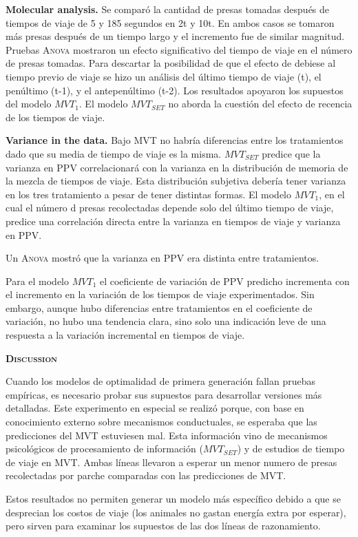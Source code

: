 \documentclass[a4paper,12pt]{article}
\begin{document}
{\bfseries Molecular analysis.} Se comparó la cantidad de presas tomadas después de tiempos de viaje de 5 y 185 segundos en 2t y 10t. En ambos casos se tomaron más presas después de un tiempo largo y el incremento fue de similar magnitud. Pruebas {\scshape Anova} mostraron un efecto significativo del tiempo de viaje en el número de presas tomadas. Para descartar la posibilidad de que el efecto de debiese al tiempo previo de viaje se hizo un análisis del último tiempo de viaje (t), el penúltimo (t-1), y el antepenúltimo (t-2). Los resultados apoyaron los supuestos del modelo $MVT_{1}$. El modelo $MVT_{SET}$ no aborda la cuestión del efecto de recencia de los tiempos de viaje.

{\bfseries Variance in the data.} Bajo MVT no habría diferencias entre los tratamientos dado que su media de tiempo de viaje es la misma. $MVT_{SET}$ predice que la varianza en PPV correlacionará con la varianza en la distribución de memoria de la mezcla de tiempos de viaje. Esta distribución subjetiva debería tener varianza en los tres tratamiento a pesar de tener distintas formas. El modelo $MVT_{1}$, en el cual el número d presas recolectadas depende solo del último tiempo de viaje, predice una correlación directa entre la varianza en tiempos de viaje y varianza en PPV.

Un {\scshape Anova} mostró que la varianza en PPV era distinta entre tratamientos.

Para el modelo $MVT_{1}$ el coeficiente de variación de PPV predicho incrementa con el incremento en la variación de los tiempos de viaje experimentados. Sin embargo, aunque hubo diferencias entre tratamientos en el coeficiente de variación, no hubo una tendencia clara, sino solo una indicación leve de una respuesta a la variación incremental en tiempos de viaje.

{\scshape\bfseries Discussion}

Cuando los modelos de optimalidad de primera generación fallan pruebas empíricas, es necesario probar sus supuestos para desarrollar versiones más detalladas. Este experimento en especial se realizó porque, con base en conocimiento externo sobre mecanismos conductuales, se esperaba que las predicciones del MVT estuviesen mal. Esta información vino de mecanismos psicológicos de procesamiento de información ($MVT_{SET}$) y de estudios de tiempo de viaje en MVT. Ambas líneas llevaron a esperar un menor numero de presas recolectadas por parche comparadas con las predicciones de MVT.

Estos resultados no permiten generar un modelo más específico debido a que se desprecian los costos de viaje (los animales no gastan energía extra por esperar), pero sirven para examinar los supuestos de las dos líneas de razonamiento.
\end{document}
